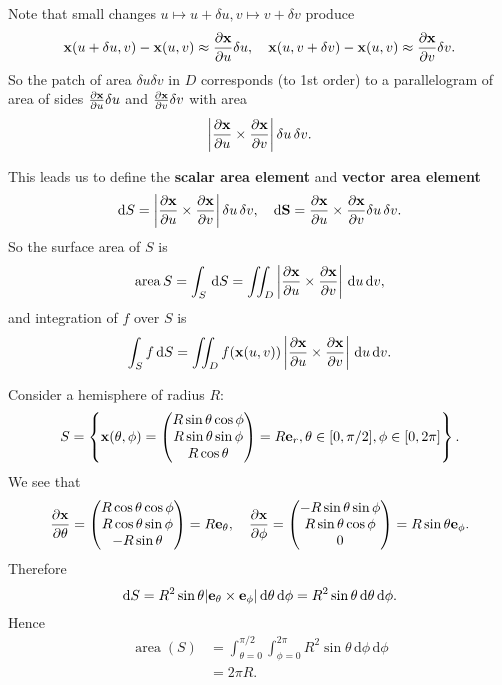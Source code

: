 Note that small changes $ u \mapsto u+\delta u,v \mapsto v+\delta v $ produce 
\[
    {\bf x}(u+\delta u,v)-{\bf x}(u,v) \approx \frac{\partial {\bf x}}{\partial u}\delta u ,\quad {\bf x}(u,v+\delta v)-{\bf x}(u,v) \approx \frac{\partial {\bf x}}{\partial v}\delta v.
\]
So the patch of area $ \delta u \delta v $ in $D$ corresponds (to 1st order) to a parallelogram of area of sides $ \frac{\partial {\bf x}}{\partial u}\delta u  $ and $ \frac{\partial {\bf x}}{\partial v}\delta v  $ with area 
\[
    \left| \frac{\partial {\bf x}}{\partial u}\times \frac{\partial {\bf x}}{\partial v} \right| \delta u \,\delta v.
\]

This leads us to define the \textbf{scalar area element} and \textbf{vector area element}
\[
    \mathrm{d} S = \left| \frac{\partial {\bf x}}{\partial u}\times \frac{\partial {\bf x}}{\partial v} \right| \delta u \,\delta v,\quad \mathrm{d} {\bf S} = \frac{\partial {\bf x}}{\partial u}\times \frac{\partial {\bf x}}{\partial v}  \delta u \,\delta v.
\]
So the surface area of $S$ is 
\[
    \operatorname{area} S = \int_{S} \,\mathrm{d}S = \iint_{D} \left| \frac{\partial {\bf x}}{\partial u}\times \frac{\partial {\bf x}}{\partial v} \right| \,\mathrm{d} u \,\mathrm{d} v,
\]
and integration of $f$ over $S$ is 
\[
    \int_{S} f \,\mathrm{d}S = \iint_{D} f({\bf x}(u,v)) \left| \frac{\partial {\bf x}}{\partial u}\times \frac{\partial {\bf x}}{\partial v} \right| \,\mathrm{d} u \,\mathrm{d} v.
\]

\begin{example}
    Consider a hemisphere of radius $R$:
    \[
        S = \left\{ {\bf x}(\theta,\phi) = \begin{pmatrix}
           R \sin \theta \cos \phi \\ R\sin \theta \sin \phi \\ R\cos \theta
        \end{pmatrix}=R{\bf e}_r,\theta\in [0,\pi/2],\phi\in [0,2\pi]\right\}.
    \]
    We see that 
    \[
        \frac{\partial {\bf x}}{\partial \theta} =  \begin{pmatrix}
            R \cos \theta \cos \phi \\ R\cos \theta \sin \phi \\ -R\sin \theta
         \end{pmatrix}=R{\bf e}_\theta,\quad
        \frac{\partial {\bf x}}{\partial \phi}= \begin{pmatrix}
            -R \sin \theta \sin \phi \\ R\sin \theta \cos \phi \\ 0
         \end{pmatrix}=R \sin \theta {\bf e}_\phi.
    \]
    Therefore 
    \[
        \mathrm{d} S = R^2 \sin \theta |{\bf e}_\theta\times {\bf e}_\phi| \,\mathrm{d} \theta\,\mathrm{d} \phi = R^2 \sin \theta\,\mathrm{d} \theta\,\mathrm{d} \phi.
    \]
    Hence 
    \begin{align*}
        \operatorname{area}(S) &= \int_{\theta=0}^{\pi/2} \int_{\phi=0}^{2\pi} R^2 \sin \theta \,\mathrm{d}\phi  \,\mathrm{d}\phi\\ 
        &= 2\pi R.
    \end{align*}
\end{example}

